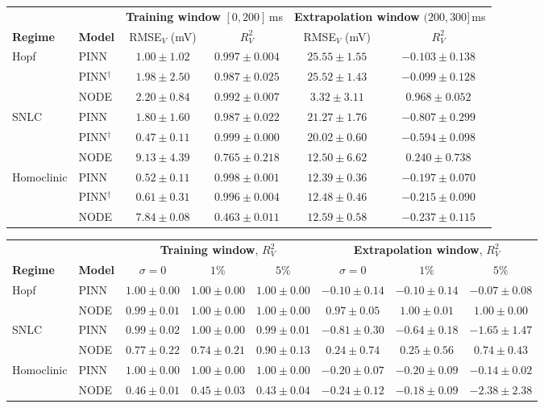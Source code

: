 \begin{tabular}{@{}llcccc@{}}
\toprule
& & \multicolumn{2}{c}{\textbf{Training window} $[0,200]$\,ms} & \multicolumn{2}{c}{\textbf{Extrapolation window} $(200,300]$\,ms} \\
\cmidrule(lr){3-4}\cmidrule(lr){5-6}
\textbf{Regime} & \textbf{Model} & RMSE$_V$ (mV) & $R^2_V$ & RMSE$_V$ (mV) & $R^2_V$ \\
\midrule
Hopf & PINN & $1.00 \pm 1.02$ & $0.997 \pm 0.004$ & $25.55 \pm 1.55$ & $-0.103 \pm 0.138$ \\
 & PINN$^{\dagger}$ & $1.98 \pm 2.50$ & $0.987 \pm 0.025$ & $25.52 \pm 1.43$ & $-0.099 \pm 0.128$ \\
 & NODE & $2.20 \pm 0.84$ & $0.992 \pm 0.007$ & $3.32 \pm 3.11$ & $0.968 \pm 0.052$ \\
\midrule
SNLC & PINN & $1.80 \pm 1.60$ & $0.987 \pm 0.022$ & $21.27 \pm 1.76$ & $-0.807 \pm 0.299$ \\
 & PINN$^{\dagger}$ & $0.47 \pm 0.11$ & $0.999 \pm 0.000$ & $20.02 \pm 0.60$ & $-0.594 \pm 0.098$ \\
 & NODE & $9.13 \pm 4.39$ & $0.765 \pm 0.218$ & $12.50 \pm 6.62$ & $0.240 \pm 0.738$ \\
\midrule
Homoclinic & PINN & $0.52 \pm 0.11$ & $0.998 \pm 0.001$ & $12.39 \pm 0.36$ & $-0.197 \pm 0.070$ \\
 & PINN$^{\dagger}$ & $0.61 \pm 0.31$ & $0.996 \pm 0.004$ & $12.48 \pm 0.46$ & $-0.215 \pm 0.090$ \\
 & NODE & $7.84 \pm 0.08$ & $0.463 \pm 0.011$ & $12.59 \pm 0.58$ & $-0.237 \pm 0.115$ \\
\bottomrule
\end{tabular}

\begin{tabular}{@{}llcccccc@{}}
\toprule
& & \multicolumn{3}{c}{\textbf{Training window}, $R^2_V$} & \multicolumn{3}{c}{\textbf{Extrapolation window}, $R^2_V$} \\
\cmidrule(lr){3-5}\cmidrule(lr){6-8}
\textbf{Regime} & \textbf{Model} & $\sigma=0$ & $1\%$ & $5\%$ & $\sigma=0$ & $1\%$ & $5\%$ \\
\midrule
Hopf & PINN & $1.00 \pm 0.00$ & $1.00 \pm 0.00$ & $1.00 \pm 0.00$ & $-0.10 \pm 0.14$ & $-0.10 \pm 0.14$ & $-0.07 \pm 0.08$ \\
 & NODE & $0.99 \pm 0.01$ & $1.00 \pm 0.00$ & $1.00 \pm 0.00$ & $0.97 \pm 0.05$ & $1.00 \pm 0.01$ & $1.00 \pm 0.00$ \\
\midrule
SNLC & PINN & $0.99 \pm 0.02$ & $1.00 \pm 0.00$ & $0.99 \pm 0.01$ & $-0.81 \pm 0.30$ & $-0.64 \pm 0.18$ & $-1.65 \pm 1.47$ \\
 & NODE & $0.77 \pm 0.22$ & $0.74 \pm 0.21$ & $0.90 \pm 0.13$ & $0.24 \pm 0.74$ & $0.25 \pm 0.56$ & $0.74 \pm 0.43$ \\
\midrule
Homoclinic & PINN & $1.00 \pm 0.00$ & $1.00 \pm 0.00$ & $1.00 \pm 0.00$ & $-0.20 \pm 0.07$ & $-0.20 \pm 0.09$ & $-0.14 \pm 0.02$ \\
 & NODE & $0.46 \pm 0.01$ & $0.45 \pm 0.03$ & $0.43 \pm 0.04$ & $-0.24 \pm 0.12$ & $-0.18 \pm 0.09$ & $-2.38 \pm 2.38$ \\
\bottomrule
\end{tabular}

